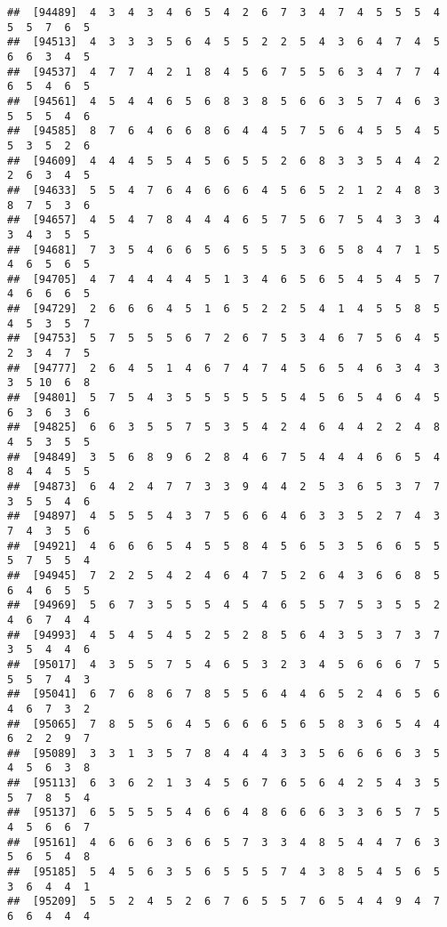 \documentclass[
]{book}
\begin{document}
\begin{verbatim}
##  [94489]  4  3  4  3  4  6  5  4  2  6  7  3  4  7  4  5  5  5  4  5  5  7  6  5
##  [94513]  4  3  3  3  5  6  4  5  5  2  2  5  4  3  6  4  7  4  5  6  6  3  4  5
##  [94537]  4  7  7  4  2  1  8  4  5  6  7  5  5  6  3  4  7  7  4  6  5  4  6  5
##  [94561]  4  5  4  4  6  5  6  8  3  8  5  6  6  3  5  7  4  6  3  5  5  5  4  6
##  [94585]  8  7  6  4  6  6  8  6  4  4  5  7  5  6  4  5  5  4  5  5  3  5  2  6
##  [94609]  4  4  4  5  5  4  5  6  5  5  2  6  8  3  3  5  4  4  2  2  6  3  4  5
##  [94633]  5  5  4  7  6  4  6  6  6  4  5  6  5  2  1  2  4  8  3  8  7  5  3  6
##  [94657]  4  5  4  7  8  4  4  4  6  5  7  5  6  7  5  4  3  3  4  3  4  3  5  5
##  [94681]  7  3  5  4  6  6  5  6  5  5  5  3  6  5  8  4  7  1  5  4  6  5  6  5
##  [94705]  4  7  4  4  4  4  5  1  3  4  6  5  6  5  4  5  4  5  7  4  6  6  6  5
##  [94729]  2  6  6  6  4  5  1  6  5  2  2  5  4  1  4  5  5  8  5  4  5  3  5  7
##  [94753]  5  7  5  5  5  6  7  2  6  7  5  3  4  6  7  5  6  4  5  2  3  4  7  5
##  [94777]  2  6  4  5  1  4  6  7  4  7  4  5  6  5  4  6  3  4  3  3  5 10  6  8
##  [94801]  5  7  5  4  3  5  5  5  5  5  5  4  5  6  5  4  6  4  5  6  3  6  3  6
##  [94825]  6  6  3  5  5  7  5  3  5  4  2  4  6  4  4  2  2  4  8  4  5  3  5  5
##  [94849]  3  5  6  8  9  6  2  8  4  6  7  5  4  4  4  6  6  5  4  8  4  4  5  5
##  [94873]  6  4  2  4  7  7  3  3  9  4  4  2  5  3  6  5  3  7  7  3  5  5  4  6
##  [94897]  4  5  5  5  4  3  7  5  6  6  4  6  3  3  5  2  7  4  3  7  4  3  5  6
##  [94921]  4  6  6  6  5  4  5  5  8  4  5  6  5  3  5  6  6  5  5  5  7  5  5  4
##  [94945]  7  2  2  5  4  2  4  6  4  7  5  2  6  4  3  6  6  8  5  6  4  6  5  5
##  [94969]  5  6  7  3  5  5  5  4  5  4  6  5  5  7  5  3  5  5  2  4  6  7  4  4
##  [94993]  4  5  4  5  4  5  2  5  2  8  5  6  4  3  5  3  7  3  7  3  5  4  4  6
##  [95017]  4  3  5  5  7  5  4  6  5  3  2  3  4  5  6  6  6  7  5  5  5  7  4  3
##  [95041]  6  7  6  8  6  7  8  5  5  6  4  4  6  5  2  4  6  5  6  4  6  7  3  2
##  [95065]  7  8  5  5  6  4  5  6  6  6  5  6  5  8  3  6  5  4  4  6  2  2  9  7
##  [95089]  3  3  1  3  5  7  8  4  4  4  3  3  5  6  6  6  6  3  5  4  5  6  3  8
##  [95113]  6  3  6  2  1  3  4  5  6  7  6  5  6  4  2  5  4  3  5  5  7  8  5  4
##  [95137]  6  5  5  5  5  4  6  6  4  8  6  6  6  3  3  6  5  7  5  4  5  6  6  7
##  [95161]  4  6  6  6  3  6  6  5  7  3  3  4  8  5  4  4  7  6  3  5  6  5  4  8
##  [95185]  5  4  5  6  3  5  6  5  5  5  7  4  3  8  5  4  5  6  5  3  6  4  4  1
##  [95209]  5  5  2  4  5  2  6  7  6  5  5  7  6  5  4  4  9  4  7  6  6  4  4  4

\end{verbatim}
\end{document}
